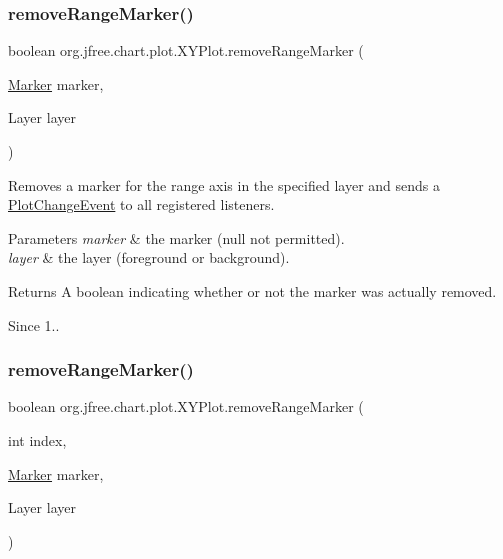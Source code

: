\subsubsection{\texorpdfstring{remove\+Range\+Marker()}{removeRangeMarker()}\hspace{0.1cm}{\footnotesize\ttfamily [2/4]}}
{\footnotesize\ttfamily boolean org.\+jfree.\+chart.\+plot.\+X\+Y\+Plot.\+remove\+Range\+Marker (\begin{DoxyParamCaption}\item[{\mbox{\hyperlink{classorg_1_1jfree_1_1chart_1_1plot_1_1_marker}{Marker}}}]{marker,  }\item[{Layer}]{layer }\end{DoxyParamCaption})}

Removes a marker for the range axis in the specified layer and sends a \mbox{\hyperlink{}{Plot\+Change\+Event}} to all registered listeners.


\begin{DoxyParams}{Parameters}
{\em marker} & the marker ({\ttfamily null} not permitted). \\
\hline
{\em layer} & the layer (foreground or background).\\
\hline
\end{DoxyParams}
\begin{DoxyReturn}{Returns}
A boolean indicating whether or not the marker was actually removed.
\end{DoxyReturn}
\begin{DoxySince}{Since}
1.. 
\end{DoxySince}
\mbox{\label{classorg_1_1jfree_1_1chart_1_1plot_1_1_x_y_plot_a0a230bad446990183e58c94b802c0c6f}} 
\subsubsection{\texorpdfstring{remove\+Range\+Marker()}{removeRangeMarker()}\hspace{0.1cm}{\footnotesize\ttfamily [3/4]}}
{\footnotesize\ttfamily boolean org.\+jfree.\+chart.\+plot.\+X\+Y\+Plot.\+remove\+Range\+Marker (\begin{DoxyParamCaption}\item[{int}]{index,  }\item[{\mbox{\hyperlink{classorg_1_1jfree_1_1chart_1_1plot_1_1_marker}{Marker}}}]{marker,  }\item[{Layer}]{layer }\end{DoxyParamCaption})}

